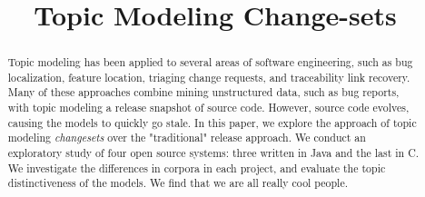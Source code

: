 \documentclass[conference]{IEEEtran}
\begin{document}
\title{Topic Modeling Change-sets}
\author{

    \and


    \and

}


\maketitle

\begin{abstract}

Topic modeling has been applied to several areas of software engineering,
such as bug localization, feature location, triaging change requests,
and traceability link recovery.
Many of these approaches combine mining unstructured data, such as bug
reports, with topic modeling a release snapshot of source code.
However, source code evolves, causing the models to quickly go stale.
In this paper, we explore the approach of topic modeling \emph{changesets}
over the "traditional" release approach.
We conduct an exploratory study of four open source systems:
three written in Java and the last in C.
We investigate the differences in corpora in each project,
and evaluate the topic distinctiveness of the models.
We find that we are all really cool people.

\end{abstract}

\begin{IEEEkeywords}
\end{IEEEkeywords}
\end{document}
